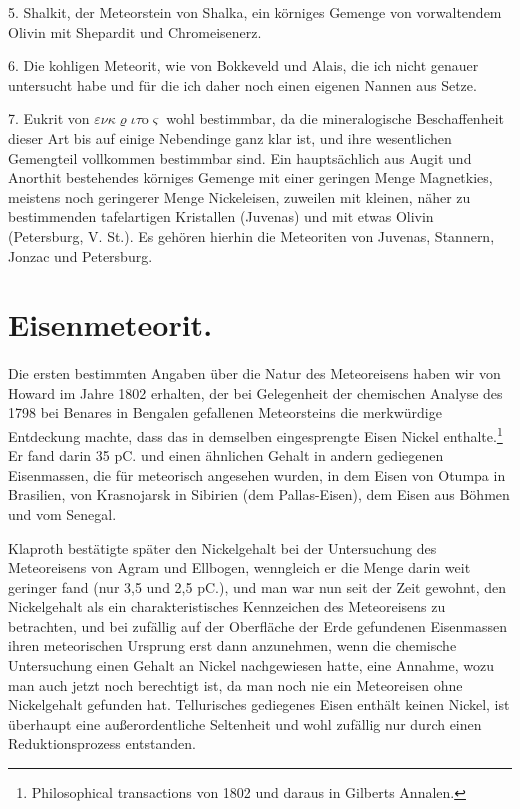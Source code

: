 \documentclass[a4paper, 11pt, oneside]{article}
\begin{document}
5. Shalkit, der Meteorstein von Shalka, ein körniges Gemenge von vorwaltendem Olivin mit Shepardit und Chromeisenerz.

6. Die kohligen Meteorit, wie von Bokkeveld und Alais, die ich nicht genauer untersucht habe und für die ich daher noch einen eigenen Nannen aus Setze.

7. Eukrit von $\varepsilon\nu\kappa\varrho\iota\tau$o$\varsigma$ wohl bestimmbar, da die mineralogische Beschaffenheit dieser Art bis auf einige Nebendinge ganz klar ist, und ihre wesentlichen Gemengteil vollkommen bestimmbar sind. Ein hauptsächlich aus Augit und Anorthit bestehendes körniges Gemenge mit einer geringen Menge Magnetkies, meistens noch geringerer Menge Nickeleisen, zuweilen mit kleinen, näher zu bestimmenden tafelartigen Kristallen (Juvenas) und mit etwas Olivin (Petersburg, V. St.). Es gehören hierhin die Meteoriten von Juvenas, Stannern, Jonzac und Petersburg.
\clearpage
\section{Eisenmeteorit.}
\paragraph{}
Die ersten bestimmten Angaben über die Natur des Meteoreisens haben wir von Howard im Jahre 1802 erhalten, der bei Gelegenheit der chemischen Analyse des 1798 bei Benares in Bengalen gefallenen Meteorsteins die merkwürdige Entdeckung machte, dass das in demselben eingesprengte Eisen Nickel enthalte.\footnote{Philosophical transactions von 1802 und daraus in Gilberts Annalen.} Er fand darin 35 pC. und einen ähnlichen Gehalt in andern gediegenen Eisenmassen, die für meteorisch angesehen wurden, in dem Eisen von Otumpa in Brasilien, von Krasnojarsk in Sibirien (dem Pallas-Eisen), dem Eisen aus Böhmen und vom Senegal.

Klaproth bestätigte später den Nickelgehalt bei der Untersuchung des Meteoreisens von Agram und Ellbogen, wenngleich er die Menge darin weit geringer fand (nur 3,5 und 2,5 pC.), und man war nun seit der Zeit gewohnt, den Nickelgehalt als ein charakteristisches Kennzeichen des Meteoreisens zu betrachten, und bei zufällig auf der Oberfläche der Erde gefundenen Eisenmassen ihren meteorischen Ursprung erst dann anzunehmen, wenn die chemische Untersuchung einen Gehalt an Nickel nachgewiesen hatte, eine Annahme, wozu man auch jetzt noch berechtigt ist, da man noch nie ein Meteoreisen ohne Nickelgehalt gefunden hat. Tellurisches gediegenes Eisen enthält keinen Nickel, ist überhaupt eine außerordentliche Seltenheit und wohl zufällig nur durch einen Reduktionsprozess entstanden.
\end{document}
